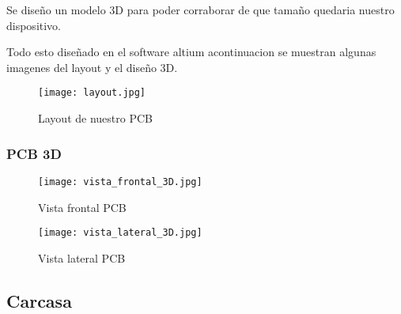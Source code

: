 Se diseño un modelo 3D para poder corraborar de que tamaño quedaria nuestro dispositivo.

Todo esto diseñado en el software altium acontinuacion se muestran algunas imagenes del layout y el diseño 3D.
\begin{figure}[htp!]
    \centering
    \texttt{[image: layout.jpg]}
    \caption{Layout de nuestro PCB}
    \label{fig: Layout}
\end{figure}\FloatBarrier

\subsubsection{PCB 3D}

\begin{figure}[htp!]
    \centering
    \texttt{[image: vista\_frontal\_3D.jpg]}
    \caption{Vista frontal PCB}
    \label{fig: frontal}
\end{figure}\FloatBarrier
\begin{figure}[htp!]
    \centering
    \texttt{[image: vista\_lateral\_3D.jpg]}
    \caption{Vista lateral PCB}
    \label{fig: lateral}
\end{figure}\FloatBarrier
\subsection{Carcasa}